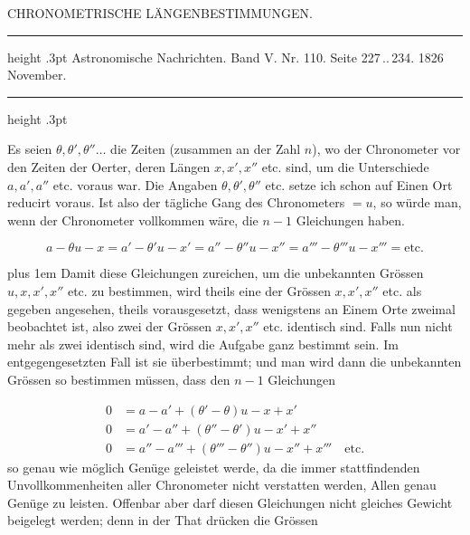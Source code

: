 \par\bigskip
{}
\hypertarget{native-460-chronometric}{}
\begin{center}{\large CHRONOMETRISCHE LÄNGENBESTIMMUNGEN.}\end{center}

\begin{center}\parbox{.86\linewidth}{\centering\small
\hrule height .3pt\relax\vspace{2.5pt}
Astronomische Nachrichten. Band V. Nr. 110. Seite 227\,..\,234. 1826 November.\par
\vspace{2.5pt}\hrule height .3pt\relax
}\end{center}

Es seien $\theta, \theta', \theta''\ldots$ die Zeiten (zusammen an der Zahl $n$), wo der Chronometer
vor den Zeiten der Oerter, deren Längen $x, x', x''$ etc. sind, um die Unterschiede
$a, a', a''$ etc. voraus war. Die Angaben $\theta, \theta', \theta''$ etc. setze ich schon auf Einen Ort
reducirt voraus. Ist also der tägliche Gang des Chronometers $=u$, so würde man, wenn
der Chronometer vollkommen wäre, die $n-1$ Gleichungen haben.

\[
a-\theta u-x = a'-\theta' u-x' = a''-\theta'' u-x'' = a'''-\theta''' u-x''' = \text{etc.}
\]

\begingroup\rightskip=0pt plus 1em
Damit diese Gleichungen zureichen, um die unbekannten Grössen $u, x, x', x''$ etc. zu
bestimmen, wird theils eine der Grössen $x, x', x''$ etc. als gegeben angesehen, theils
vorausgesetzt, dass wenigstens an Einem Orte zweimal beobachtet ist, also zwei der
Grössen $x, x', x''$ etc. identisch sind. Falls nun nicht mehr als zwei identisch sind, wird
die Aufgabe ganz bestimmt sein. Im entgegengesetzten Fall ist sie überbestimmt; und man
wird dann die unbekannten Grössen so bestimmen müssen, dass den $n-1$ Gleichungen\par\endgroup

\[
\begin{aligned}
0 &= a-a'+(\theta'-\theta)u-x+x'\\
0 &= a'-a''+(\theta''-\theta')u-x'+x''\\
0 &= a''-a'''+(\theta'''-\theta'')u-x''+x''' \quad \text{etc.}
\end{aligned}
\]
\noindent so genau wie möglich Genüge geleistet werde, da die immer stattfindenden
Unvollkommenheiten aller Chronometer nicht verstatten werden, Allen genau Genüge zu
leisten. Offenbar aber darf diesen Gleichungen nicht gleiches Gewicht beigelegt werden;
denn in der That drücken die Grössen

